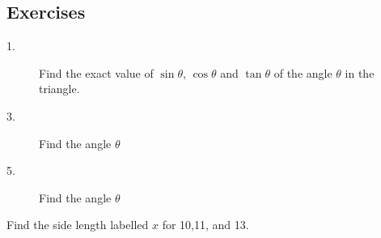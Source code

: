\subsection{Exercises}

\begin{description}
 
\item [1.]  Find the exact value of $\sin  \theta $, $\cos  \theta $ and $\tan  \theta $ of the angle $\theta $ in the triangle. \\
 

\setlength\fboxrule{0in}\setlength\fboxsep{0.2in}


\item [3.]  Find the angle $\theta$  
\setlength\fboxrule{0in}\setlength\fboxsep{0.2in}

 

\item [5.] Find the angle $\theta$
\setlength\fboxrule{0in}\setlength\fboxsep{0.2in}
\end{description}
\clearpage
Find the side length labelled $x$ for 10,11, and 13. 


